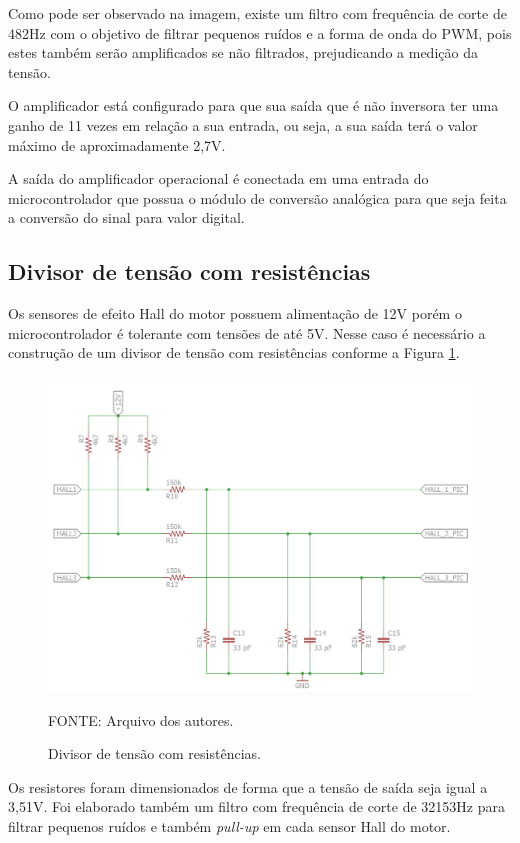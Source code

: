 \documentclass[
	12pt,				%
	openany,			%
	twoside,			%
	a4paper,			%
	english,			%
	french,				%
	spanish,			%
	brazil,				%
	oldfontcommands
	]{abntex2}
\begin{document}

Como pode ser observado na imagem, existe um filtro com frequência de corte de 482Hz com o objetivo de filtrar pequenos ruídos e a forma de onda do PWM, pois estes também serão amplificados se não filtrados, prejudicando a medição da tensão.

O amplificador está configurado para que sua saída que é não inversora ter uma ganho de 11 vezes em relação a sua entrada, ou seja, a sua saída terá o valor máximo de aproximadamente 2,7V.

A saída do amplificador operacional é conectada em uma entrada do microcontrolador que possua o módulo de conversão analógica para que seja feita a conversão do sinal para valor digital.  

\subsection{Divisor de tensão com resistências}

Os sensores de efeito Hall do motor possuem alimentação de 12V porém o microcontrolador é tolerante com tensões de até 5V. Nesse caso é necessário a construção de um divisor de tensão com resistências  conforme a Figura \ref{fig:Divisor_tensao}. 

\begin{figure}[th]
	\caption{Divisor de tensão com resistências.}
	\centering
	\includegraphics[width=0.75\linewidth]{./figs/Halls_motores}
	
	\begin{small}
		FONTE: Arquivo dos autores.
	\end{small}
	\label{fig:Divisor_tensao}
\end{figure}

\newpage

Os resistores foram dimensionados de forma que a tensão de saída seja igual a 3,51V. Foi elaborado também um filtro com frequência de corte de 32153Hz para filtrar pequenos ruídos e também \textit{pull-up} em cada sensor Hall do motor.
\end{document}
